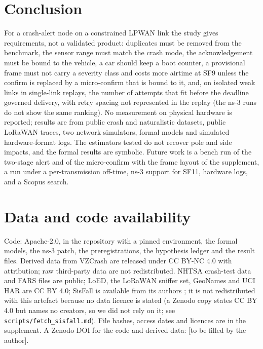 \documentclass{ieeeaccess}
\begin{document}
\section{Conclusion}
\label{sec:concl}
For a crash-alert node on a constrained LPWAN link the study gives requirements, not a validated product: duplicates must be removed from the benchmark, the sensor range must match the crash mode, the acknowledgement must be bound to the vehicle, a car should keep a boot counter, a provisional frame must not carry a severity class and costs more airtime at SF9 unless the confirm is replaced by a micro-confirm that is bound to it, and, on isolated weak links in single-link replays, the number of attempts that fit before the deadline governed delivery, with retry spacing not represented in the replay (the ns-3 runs do not show the same ranking). No measurement on physical hardware is reported; results are from public crash and naturalistic datasets, public LoRaWAN traces, two network simulators, formal models and simulated hardware-format logs. The estimators tested do not recover pole and side impacts, and the formal results are symbolic. Future work is a bench run of the two-stage alert and of the micro-confirm with the frame layout of the supplement, a run under a per-transmission off-time, ns-3 support for SF11, hardware logs, and a Scopus search.

\section*{Data and code availability}
Code: Apache-2.0, in the repository with a pinned environment, the formal models, the ns-3 patch, the preregistrations, the hypothesis ledger and the result files. Derived data from VZCrash are released under CC BY-NC 4.0 with attribution; raw third-party data are not redistributed. NHTSA crash-test data and FARS files are public; LoED, the LoRaWAN sniffer set, GeoNames and UCI HAR are CC BY 4.0; SisFall is available from its authors \cite{Sucerquia2017_sisfall}; it is not redistributed with this artefact because no data licence is stated (a Zenodo copy states CC BY 4.0 but names no creators, so we did not rely on it; see \texttt{scripts/fetch\_sisfall.md}). File hashes, access dates and licences are in the supplement. A Zenodo DOI for the code and derived data: [to be filled by the author].
\end{document}
